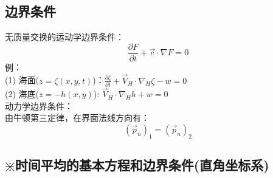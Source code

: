 \documentclass[a4paper,12pt]{article}
\begin{document}
    \subsection{边界条件}
    无质量交换的运动学边界条件：
    \[
        \frac{\partial F}{\partial t} + \vec{c} \cdot \nabla F=0
    \]
    例：\\
    (1) 海面($z=\displaystyle \zeta (x,y,t)$)：$\displaystyle \frac{\partial \zeta}{\partial t}+\vec{V}_{H} \cdot \nabla_{H} \zeta-w=0$\\
    (2) 海底($\displaystyle z=-h(x,y)$): $\displaystyle \vec{V}_{H} \cdot \nabla_{H} h+w=0$\\
    动力学边界条件：\\
    由牛顿第三定律，在界面法线方向有：
    \[
        \left(\vec{p}_{n}\right)_{1}=\left(\vec{p}_{n}\right)_{2}
    \]
    \subsection{ \texorpdfstring{\color{red} $\divideontimes$} 时时间平均的基本方程和边界条件(直角坐标系)}
\end{document}
